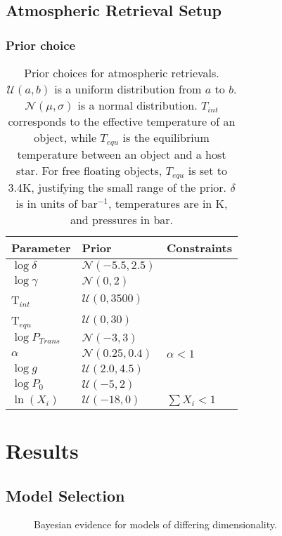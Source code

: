 \subsection{Atmospheric Retrieval Setup}
\subsubsection{Prior choice}
\begin{table}[t]
	\centering
	\begin{tabular}{lll}
		\toprule
		\textbf{Parameter} & \textbf{Prior} & \textbf{Constraints}\\
		\midrule
		$\log\delta$ & $\mathcal{N}(-5.5,2.5)$&\\
		$\log\gamma$ & $\mathcal{N}(0,2)$&\\
		T$_{int}$ & $\mathcal{U}(0,3500)$&\\
		T$_{equ}$ & $\mathcal{U}(0,30)$&\\
		$\log P_{Trans}$ & $\mathcal{N}(-3,3)$&\\
		$\alpha$ & $\mathcal{N}(0.25,0.4)$&$\alpha < 1$\\
		$\log g$ & $\mathcal{U}(2.0,4.5)$&\\
		$\log P_{0}$ & $\mathcal{U}(-5,2)$&\\
		$\ln(X_{i})$ & $\mathcal{U}(-18,0)$ & $\sum X_{i} < 1$\\
		\bottomrule		
	\end{tabular}
	\caption{Prior choices for atmospheric retrievals. $\mathcal{U}(a,b)$ is a uniform distribution from $a$ to $b$. $\mathcal{N}(\mu,\sigma)$ is a normal distribution. $T_{int}$ corresponds to the effective temperature of an object, while $T_{equ}$ is the equilibrium temperature between an object and a host star. For free floating objects, $T_{equ}$ is set to 3.4K, justifying the small range of the prior. $\delta$ is in units of bar$^{-1}$, temperatures are in K, and pressures in bar.}
	\label{tab:priors}
\end{table}

\section{Results}
\subsection{Model Selection}
\begin{figure}[h]
	\caption{Bayesian evidence for models of differing dimensionality.}
	\label{fig:bicdim}
\end{figure}
